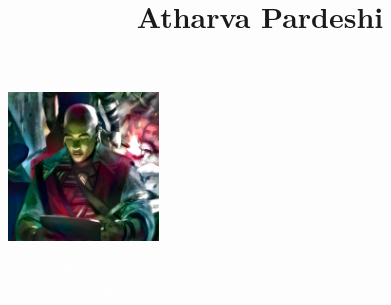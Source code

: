 \documentclass[11pt, oneside, a4paper, titlepage]{article}
\title{Atharva Pardeshi}
\date{}
\begin{document}
\begin{tcolorbox}
  \begin{minipage}{4.5cm}
    \hspace*{-0.2cm}\includegraphics[width=4cm]{spooky-sazed.png}
  \end{minipage}
  \begin{minipage}{15cm}
    \begin{center}
      \Huge{\textcolor{white}{Atharva Pardeshi}} \\
      \vspace*{0.5cm}
      \Large{\textcolor{white}{\textit{Software Developer}}}
    \end{center}
  \end{minipage}
\end{tcolorbox}
\end{document}
